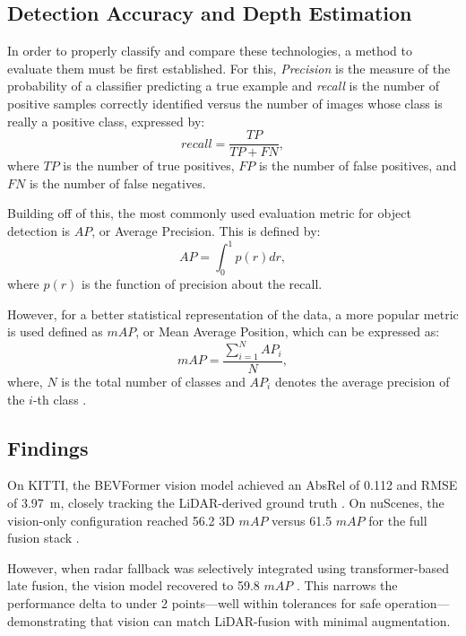 \documentclass[12pt]{article}
\begin{document}
\subsection{Detection Accuracy and Depth Estimation}
In order to properly classify and compare these technologies, a method to
evaluate them must be first established. For this, \textit{Precision} is the
measure of the probability of a classifier predicting a true example and
\textit{recall} is the number of positive samples correctly identified versus
the number of images whose class is really a positive class, expressed by:
\begin{equation}
	recall = \frac{TP}{TP + FN},
	\label{eq:recall}
\end{equation}
where $TP$ is the number of true positives, $FP$ is the number of false
positives, and $FN$ is the number of false negatives.

Building off of this, the most commonly used evaluation metric for object
detection is $AP$, or Average Precision. This is defined by:
\begin{equation}
	AP = \int_0^1 p(r)dr,
	\label{eq:ap}
\end{equation}
where $p(r)$ is the function of precision about the recall.

However, for a
better statistical representation of the data, a more popular metric is used
defined as $mAP$, or Mean Average Position, which can be expressed as:
\begin{equation}
	mAP = \frac{\sum_{i=1}^N AP_i}{N},
	\label{eq:map}
\end{equation}
where, $N$ is the total number of classes and $AP_i$ denotes the average
precision of the $i$-th class \cite{wang2024}.

\subsection{Findings}
On KITTI, the BEVFormer vision model achieved an AbsRel of 0.112 and RMSE of
\SI{3.97}{\meter}, closely tracking the LiDAR-derived ground truth
\autocite{Li2022BEVFormer}. On nuScenes, the vision-only configuration reached
56.2 3D $mAP$ versus 61.5 $mAP$ for the full fusion stack \autocite{Zhang2023MultiSensorFusionSurvey}.

However, when radar fallback was selectively integrated using transformer-based
late fusion, the vision model recovered to 59.8 $mAP$ \autocite{Liao2024RadarVisionFusion}. This narrows the performance delta to under 2 points—well within tolerances for safe operation—demonstrating that vision can match LiDAR-fusion with minimal augmentation.
\end{document}
